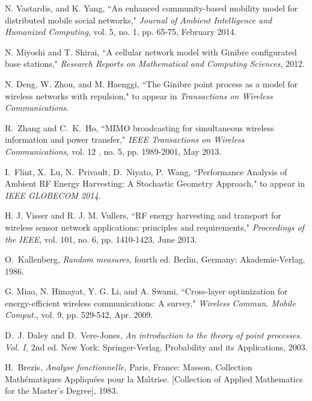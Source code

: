 \documentclass[12pt,draftclsnofoot,onecolumn]{IEEEtran}
\begin{document}
\begin{thebibliography}{99}
N. Vastardis, and K. Yang, ``An enhanced community-based mobility model for distributed mobile social networks," \emph{Journal of Ambient Intelligence and Humanized Computing}, vol. 5, no. 1, pp. 65-75, February 2014. 

N. Miyoshi and T. Shirai, ``A cellular network model with Ginibre configurated base stations," \emph{Research Reports on Mathematical and Computing Sciences}, 2012.

N. Deng, W. Zhou, and M. Haenggi, ``The Ginibre point process as a model for wireless networks with repulsion," to appear in {\em Transactions on Wireless Communications}.


R.~Zhang and C.~K.~Ho, ``MIMO broadcasting for simultaneous wireless information and power transfer," \emph{IEEE Transactions on Wireless Communications}, vol. 12 , no. 5, pp. 1989-2001, May 2013. 

I.~Flint, X.~Lu, N.~Privault, D.~Niyato, P.~Wang, ``Performance Analysis of Ambient RF Energy Harvesting: A Stochastic Geometry Approach," to appear in \emph{IEEE GLOBECOM 2014}.


H. J. Visser and R. J. M. Vullers, ``RF energy harvesting and transport for wireless sensor network applications: principles and requirements," \emph{Proceedings of the IEEE}, vol. 101, no. 6, pp. 1410-1423, June 2013.













O.~Kallenberg, { \em Random measures,} fourth ed. Berlin, Germany: Akademie-Verlag, 1986.

G. Miao, N. Himayat, Y. G. Li, and A. Swami, ``Cross-layer optimization for energy-efficient wireless communications: A survey," \emph{Wireless Commun. Mobile Comput.}, vol. 9, pp. 529-542, Apr. 2009.


D.~J. Daley and D.~Vere-Jones, {\em An introduction to the theory of point processes. Vol. I,} 2nd ed. New York: Springer-Verlag, Probability and its Applications,  2003. 

H.~Brezis, {\em Analyse fonctionnelle,} Paris, France: Masson, Collection Math\'ematiques Appliqu\'ees pour la Ma\^\i trise.
[Collection of Applied Mathematics for the Master's Degree], 1983. 


\end{thebibliography}
\end{document}
